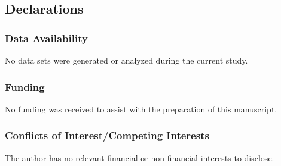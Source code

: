 \documentclass{article}
\theoremstyle{definition}
\numberwithin{equation}{section}
\begin{document}
\subsection*{Declarations}

\subsubsection*{Data Availability}

No data sets were generated or analyzed during the current study.

\subsubsection*{Funding}

No funding was received to assist with the preparation of this manuscript.

\subsubsection*{Conflicts of Interest/Competing Interests}

The author has no relevant financial or non-financial interests to disclose.
\end{document}
